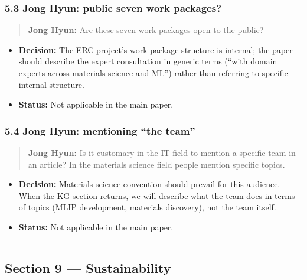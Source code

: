 \subsubsection{5.3 Jong Hyun: public seven work packages?}\label{jong-hyun-public-seven-work-packages}

\begin{quote}
\textbf{Jong Hyun:} Are these seven work packages open to the public?
\end{quote}

\begin{itemize}
\tightlist
\item
  \textbf{Decision:} The ERC project's work package structure is internal; the paper should describe the expert consultation in generic terms (``with domain experts across materials science and ML'') rather than referring to specific internal structure.
\item
  \textbf{Status:} {\color{orange!80!black}\faPauseCircle} Not applicable in the main paper.
\end{itemize}

\subsubsection{5.4 Jong Hyun: mentioning ``the team''}\label{jong-hyun-mentioning-the-team}

\begin{quote}
\textbf{Jong Hyun:} Is it customary in the IT field to mention a specific team in an article? In the materials science field people mention specific topics.
\end{quote}

\begin{itemize}
\tightlist
\item
  \textbf{Decision:} Materials science convention should prevail for this audience. When the KG section returns, we will describe what the team does in terms of topics (MLIP development, materials discovery), not the team itself.
\item
  \textbf{Status:} {\color{orange!80!black}\faPauseCircle} Not applicable in the main paper.
\end{itemize}

\begin{center}\rule{0.5\linewidth}{0.5pt}\end{center}

\subsection{Section 9 --- Sustainability}\label{section-9-sustainability}


